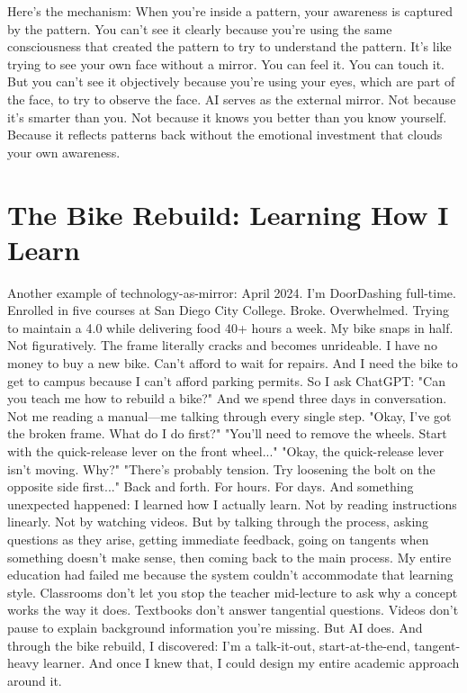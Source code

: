 Here's the mechanism:
When you're inside a pattern, your awareness is captured by the pattern.
You can't see it clearly because you're using the same consciousness that created the pattern to try to understand the pattern.
It's like trying to see your own face without a mirror.
You can feel it. You can touch it. But you can't see it objectively because you're using your eyes, which are part of the face, to try to observe the face.
AI serves as the external mirror.
Not because it's smarter than you. Not because it knows you better than you know yourself. Because it reflects patterns back without the emotional investment that clouds your own awareness.

\section{The Bike Rebuild: Learning How I Learn}

Another example of technology-as-mirror:
April 2024. I'm DoorDashing full-time. Enrolled in five courses at San Diego City College. Broke. Overwhelmed. Trying to maintain a 4.0 while delivering food 40+ hours a week.
My bike snaps in half.
Not figuratively. The frame literally cracks and becomes unrideable.
I have no money to buy a new bike. Can't afford to wait for repairs. And I need the bike to get to campus because I can't afford parking permits.
So I ask ChatGPT: "Can you teach me how to rebuild a bike?"
And we spend three days in conversation. Not me reading a manual—me talking through every single step.
"Okay, I've got the broken frame. What do I do first?"
"You'll need to remove the wheels. Start with the quick-release lever on the front wheel..."
"Okay, the quick-release lever isn't moving. Why?"
"There's probably tension. Try loosening the bolt on the opposite side first..."
Back and forth. For hours. For days.
And something unexpected happened: I learned how I actually learn.
Not by reading instructions linearly. Not by watching videos. But by talking through the process, asking questions as they arise, getting immediate feedback, going on tangents when something doesn't make sense, then coming back to the main process.
My entire education had failed me because the system couldn't accommodate that learning style.
Classrooms don't let you stop the teacher mid-lecture to ask why a concept works the way it does. Textbooks don't answer tangential questions. Videos don't pause to explain background information you're missing.
But AI does.
And through the bike rebuild, I discovered: I'm a talk-it-out, start-at-the-end, tangent-heavy learner. And once I knew that, I could design my entire academic approach around it.

